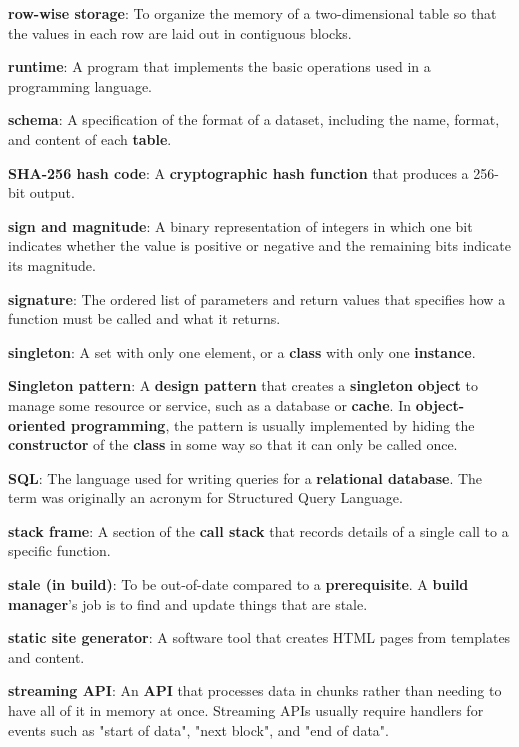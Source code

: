 \documentclass{scrbook}
\newcommand{\glosskey}[1]{\textbf{#1}}
\begin{document}
\noindent \textbf{\glosskey{row-wise storage}}: 
To organize the memory of a two-dimensional table so that the values in each row are laid out in contiguous blocks.


\noindent \textbf{\glosskey{runtime}}: 
A program that implements the basic operations used in a programming language.


\noindent \textbf{\glosskey{schema}}: 
A specification of the format of a dataset, including the name, format, and content of each \glosskey{table}.


\noindent \textbf{\glosskey{SHA-256 hash code}}: 
A \glosskey{cryptographic hash function} that produces a 256-bit output.


\noindent \textbf{\glosskey{sign and magnitude}}: 
A binary representation of integers in which one bit indicates whether the value is positive or negative and the remaining bits indicate its magnitude.


\noindent \textbf{\glosskey{signature}}: 
The ordered list of parameters and return values that specifies how a function must be called and what it returns.


\noindent \textbf{\glosskey{singleton}}: 
A set with only one element, or a \glosskey{class} with only one \glosskey{instance}.


\noindent \textbf{\glosskey{Singleton pattern}}: 
A \glosskey{design pattern} that creates a \glosskey{singleton} \glosskey{object} to manage some resource or service, such as a database or \glosskey{cache}. In \glosskey{object-oriented programming}, the pattern is usually implemented by hiding the \glosskey{constructor} of the \glosskey{class} in some way so that it can only be called once.


\noindent \textbf{\glosskey{SQL}}: 
The language used for writing queries for a \glosskey{relational database}. The term was originally an acronym for Structured Query Language.


\noindent \textbf{\glosskey{stack frame}}: 
A section of the \glosskey{call stack} that records details of a single call to a specific function.


\noindent \textbf{\glosskey{stale (in build)}}: 
To be out-of-date compared to a \glosskey{prerequisite}. A \glosskey{build manager}'s job is to find and update things that are stale.


\noindent \textbf{\glosskey{static site generator}}: 
A software tool that creates HTML pages from templates and content.


\noindent \textbf{\glosskey{streaming API}}: 
An \glosskey{API} that processes data in chunks rather than needing to have all of it in memory at once. Streaming APIs usually require handlers for events such as "start of data", "next block", and "end of data".
\end{document}
